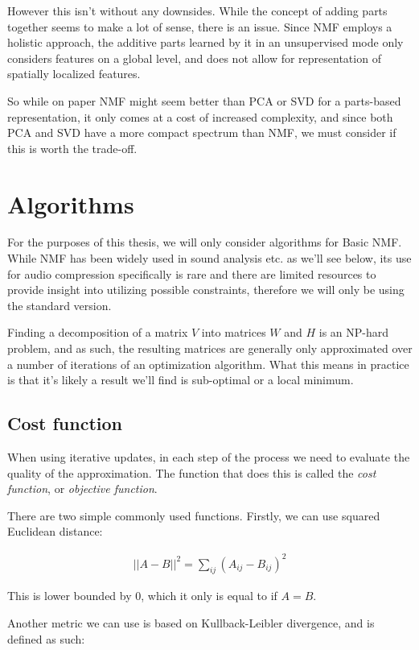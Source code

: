However this isn't without any downsides. While the concept of adding parts together seems to make a lot of sense, there is an issue. Since NMF employs a holistic approach, the additive parts learned by it in an unsupervised mode only considers features on a global level, and does not allow for representation of spatially localized features. \cite{li_spatial_lnmf_2001}

So while on paper NMF might seem better than PCA or SVD for a parts-based representation, it only comes at a cost of increased complexity, and since both PCA and SVD have a more compact spectrum than NMF, we must consider if this is worth the trade-off. \cite{wang_zhang_2013}

\section{Algorithms}
For the purposes of this thesis, we will only consider algorithms for Basic NMF. While NMF has been widely used in sound analysis etc. as we'll see below, its use for audio compression specifically is rare and there are limited resources to provide insight into utilizing possible constraints, therefore we will only be using the standard version.

Finding a decomposition of a matrix $V$ into matrices $W$ and $H$ is an NP-hard problem, and as such, the resulting matrices are generally only approximated over a number of iterations of an optimization algorithm. What this means in practice is that it's likely a result we'll find is sub-optimal or a local minimum.

\subsection{Cost function}
When using iterative updates, in each step of the process we need to evaluate the quality of the approximation. The function that does this is called the \emph{cost function}, or \emph{objective function}.

There are two simple commonly used functions. Firstly, we can use squared Euclidean distance: \cite{pentti_pmf_1997}

\begin{align}
||A-B||^2 = \sum_{ij}(A_{ij} - B_{ij})^2
\end{align}

This is lower bounded by 0, which it only is equal to if $A = B$.

Another metric we can use is based on Kullback-Leibler divergence, and is defined as such: \cite{nmf_algorithms}

